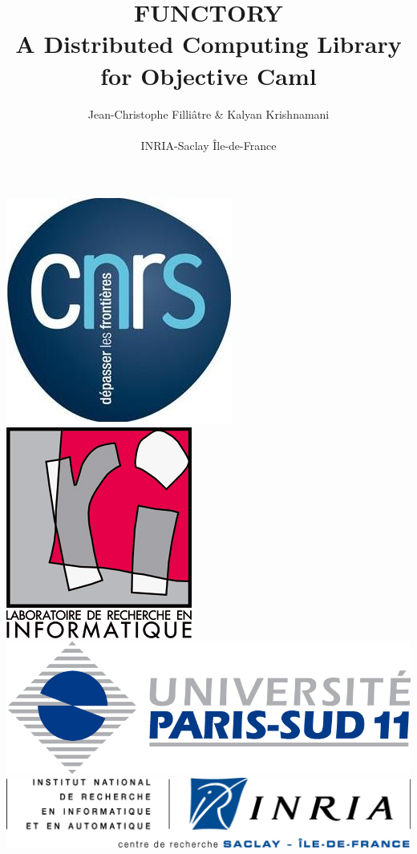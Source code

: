 \documentclass[xcolor=dvipsnames,8pt]{beamer}
\begin{document}

\title{FUNCTORY \\ A Distributed Computing Library for Objective Caml}

\author[Kalyan]{Jean-Christophe Filli\^{a}tre \& Kalyan Krishnamani\\
  \- \\ 
  INRIA-Saclay \^{I}le-de-France}
\date {}


\begin{frame}
  \titlepage
  \begin{center}
    \includegraphics[scale=0.11]{cnrs-logo2.jpg}
    \hspace{4mm}
    \includegraphics[scale=0.09]{lrilogo.jpg}
    \hspace{4mm}
    \includegraphics[scale=0.09]{upsudlogo.jpg}
    \hspace{4mm}
    \includegraphics[scale=0.4]{inria-saclay.jpeg}
  \end{center}
\end{frame}
\end{document}
